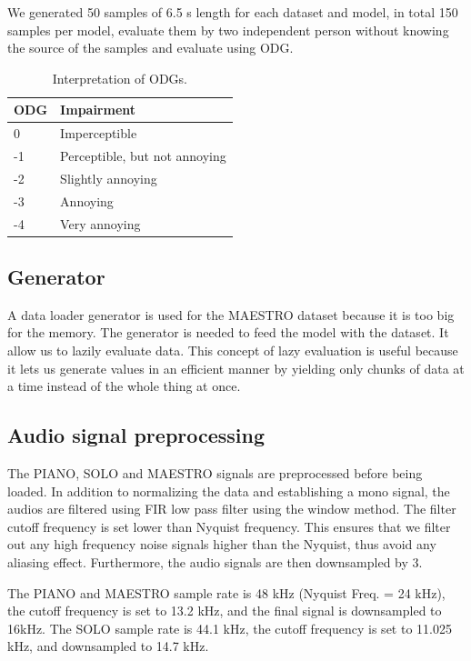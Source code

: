 \documentclass{article} %
\begin{document}
We generated 50 samples of 6.5 s length for each dataset and model, in total 150 samples per model, evaluate them by two independent person without knowing the source of the samples and evaluate using ODG.

\begin{table}[ht]
    \centering
    \begin{tabular}{l|l}
        \hline
        ODG & Impairment \\
        \hline
        0   & Imperceptible \\
        -1  & Perceptible, but not annoying \\ 
        -2  & Slightly annoying \\
        -3  & Annoying \\
        -4  & Very annoying \\
        \hline
    \end{tabular}
    \caption{Interpretation of ODGs.}
    \label{tab:odg}
\end{table}

\subsection{Generator}
A data loader generator is used for the MAESTRO dataset because it is too big for the memory. The generator is needed to feed the model with the dataset. It allow us to lazily evaluate data. This concept of lazy evaluation is useful because it lets us generate values in an efficient manner by yielding only chunks of data at a time instead of the whole thing at once.

\subsection{Audio signal preprocessing}
The PIANO, SOLO and MAESTRO signals are preprocessed before being loaded. In addition to normalizing the data and establishing a mono signal, the audios are filtered using FIR low pass filter using the window method. The filter cutoff frequency is set lower than Nyquist frequency. This ensures that we filter out any high frequency noise signals higher than the Nyquist, thus avoid any aliasing effect. Furthermore, the audio signals are then downsampled by 3.

The PIANO and MAESTRO sample rate is 48 kHz (Nyquist Freq. = 24 kHz), the cutoff frequency is set to 13.2 kHz, and the final signal is downsampled to 16kHz. The SOLO sample rate is 44.1 kHz, the cutoff frequency is set to 11.025 kHz, and downsampled to 14.7 kHz.
\end{document}
